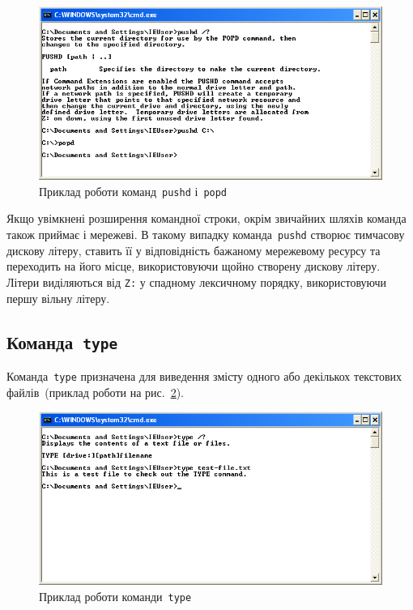 \documentclass[
	a4paper,
	oneside,
	DIV = 12,
	fontsize = 13pt,
	headings = normal,
]{scrartcl}
\newcommand{\progname}[1]{\texttt{#1}}
\begin{document}
			\begin{figure}[!htbp]
				\centering
				\includegraphics[height = 6\baselineskip]{../01-solution/y03s01-pcdiag-lab-06-p04.png}
				\caption{Приклад роботи команд~\progname{pushd} і~\progname{popd}}
				\label{fig:pushd-popd-usage}
			\end{figure}

			Якщо увімкнені розширення командної строки, окрім звичайних шляхів команда також приймає і мережеві. В такому випадку команда~\progname{pushd} створює тимчасову дискову літеру, ставить її у відповідність бажаному мережевому ресурсу та переходить на його місце, використовуючи щойно створену дискову літеру. Літери виділяються від \textenglish{\texttt{Z:}} у спадному лексичному порядку, використовуючи першу вільну літеру.

		\subsection{Команда~\progname{type}}
			Команда~\progname{type} призначена для виведення змісту одного або декількох текстових файлів~(приклад роботи на рис.~\ref{fig:type-usage}).

			\begin{figure}[!htbp]
				\centering
				\includegraphics[height = 6\baselineskip]{../01-solution/y03s01-pcdiag-lab-06-p05.png}
				\caption{Приклад роботи команди~\progname{type}}
				\label{fig:type-usage}
			\end{figure}
\end{document}

